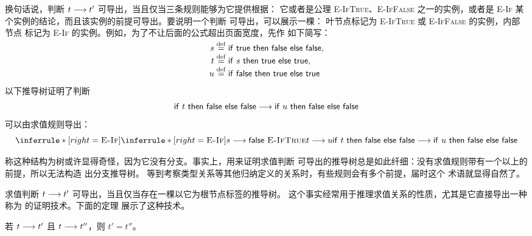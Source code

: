 换句话说，判断 \(t\mathrel{\longrightarrow} t'\) 可导出，当且仅当三条规则能够为它提供根据：
它或者是公理 \textsc{E-IfTrue}、\textsc{E-IfFalse} 之一的实例，或者是
\textsc{E-If} 某个实例的结论，而且该实例的前提可导出。要说明一个判断
可导出，可以展示一棵：
叶节点标记为 \textsc{E-IfTrue} 或 \textsc{E-IfFalse} 的实例，内部节点
标记为 \textsc{E-If} 的实例。例如，为了不让后面的公式超出页面宽度，先作
如下简写：
\[
\begin{aligned}
 s&\mathrel{\smash{\overset{\mathrm{def}}{=}}}
   \mathsf{if\ true\ then\ false\ else\ false},\\
 t&\mathrel{\smash{\overset{\mathrm{def}}{=}}}
   \mathsf{if}\ s\ \mathsf{then\ true\ else\ true},\\
 u&\mathrel{\smash{\overset{\mathrm{def}}{=}}}
   \mathsf{if\ false\ then\ true\ else\ true}
\end{aligned}
\]
以下推导树证明了判断
\[
 \mathsf{if}\ t\ \mathsf{then\ false\ else\ false}
 \mathrel{\longrightarrow}
 \mathsf{if}\ u\ \mathsf{then\ false\ else\ false}
\]
可以由求值规则导出：
\[
\inferrule*[right=\textsc{E-If}]
  {\inferrule*[right=\textsc{E-If}]
    {s\trans\taplfalse\ \textsc{E-IfTrue}}
    {t\trans u}}
  {\mathsf{if}\ t\ \mathsf{then\ false\ else\ false}
   \trans
   \mathsf{if}\ u\ \mathsf{then\ false\ else\ false}}
\]


称这种结构为树或许显得奇怪，因为它没有分支。事实上，用来证明求值判断
可导出的推导树总是如此纤细：没有求值规则带有一个以上的前提，所以无法构造
出分支推导树。
等到考察类型关系等其他归纳定义的关系时，有些规则会有多个前提，届时这个
术语就显得自然了。

求值判断 \(t\mathrel{\longrightarrow} t'\) 可导出，当且仅当存在一棵以它为根节点标签的推导树。
这个事实经常用于推理求值关系的性质，尤其是它直接导出一种称为
的证明技术。下面的定理
展示了这种技术。

\begin{theorem}[单步求值的确定性]
\label{thm:3.5.4}
若 \(t\mathrel{\longrightarrow} t'\) 且 \(t\mathrel{\longrightarrow} t''\)，则 \(t'=t''\)。
\end{theorem}

